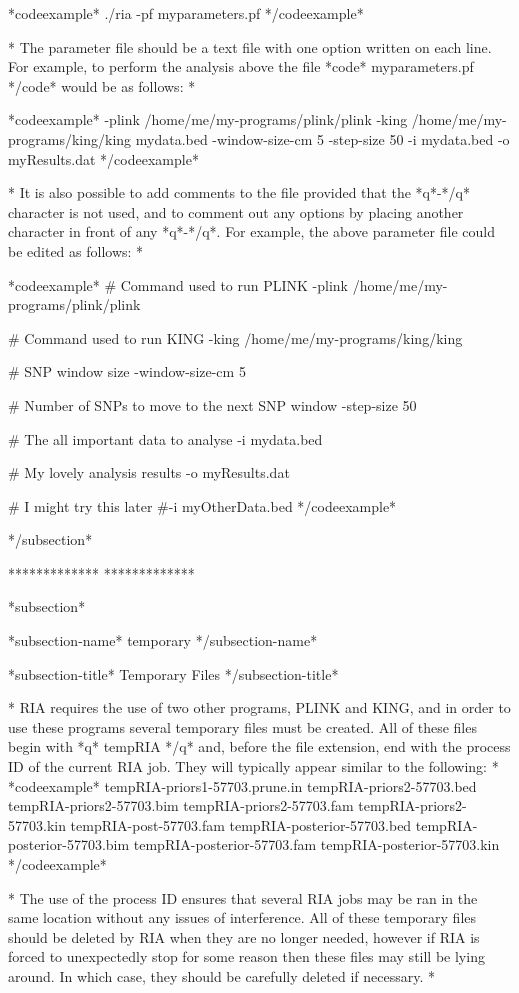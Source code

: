 *codeexample*
./ria -pf myparameters.pf
*/codeexample*

* The parameter file should be a text file with one option written on each line. For example, to perform the analysis above the file *code* myparameters.pf */code* would be as follows: *

*codeexample*
-plink /home/me/my-programs/plink/plink
-king /home/me/my-programs/king/king mydata.bed
-window-size-cm 5
-step-size 50
-i mydata.bed
-o myResults.dat
*/codeexample*

* It is also possible to add comments to the file provided that the *q*-*/q* character is not used, and to comment out any options by placing another character in front of any *q*-*/q*. For example, the above parameter file could be edited as follows: *


*codeexample*
# Command used to run PLINK
-plink /home/me/my-programs/plink/plink

# Command used to run KING
-king /home/me/my-programs/king/king

# SNP window size
-window-size-cm 5

# Number of SNPs to move to the next SNP window
-step-size 50

# The all important data to analyse
-i mydata.bed

# My lovely analysis results
-o myResults.dat

# I might try this later
#-i myOtherData.bed
*/codeexample*

*/subsection*

*************
*************

*subsection*

*subsection-name* temporary */subsection-name*

*subsection-title* Temporary Files */subsection-title*


*
RIA requires the use of two other programs, PLINK and KING, and in order to use these programs several temporary files must be created. All of these files begin with *q* tempRIA */q* and, before the file extension, end with the process ID of the current RIA job. They will typically appear similar to the following:
*
*codeexample*
tempRIA-priors1-57703.prune.in
tempRIA-priors2-57703.bed
tempRIA-priors2-57703.bim
tempRIA-priors2-57703.fam
tempRIA-priors2-57703.kin
tempRIA-post-57703.fam
tempRIA-posterior-57703.bed
tempRIA-posterior-57703.bim
tempRIA-posterior-57703.fam
tempRIA-posterior-57703.kin
*/codeexample*
 
*
The use of the process ID ensures that several RIA jobs may be ran in the same location without any issues of interference. All of these temporary files should be deleted by RIA when they are no longer needed, however if RIA is forced to unexpectedly stop for some reason then these files may still be lying around. In which case, they should be carefully deleted if necessary.
*

